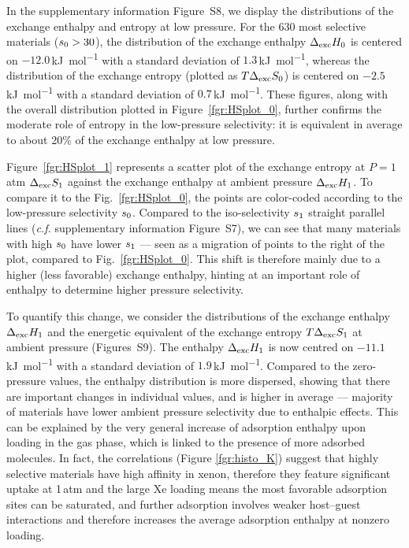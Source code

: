 \documentclass[main]{subfiles}
\begin{document}
  
  In the supplementary information Figure~S8, we display the distributions of the exchange enthalpy and entropy at low pressure. For the 630 most selective materials ($s_{\text{0}} > 30$), the distribution of the exchange enthalpy $\Delta_{\text{exc}}H_{\text{0}}$ is centered on $-12.0$\,\si{\kilo\joule\per\mol} with a standard deviation of $1.3$\,\si{\kilo\joule\per\mol}, whereas the distribution of the exchange entropy (plotted as $T\Delta_{\text{exc}}S_{\text{0}}$) is centered on $-2.5$\,\si{\kilo\joule\per\mol} with a standard deviation of $0.7$\,\si{\kilo\joule\per\mol}. These figures, along with the overall distribution plotted in Figure~\ref{fgr:HSplot_0}, further confirms the moderate role of entropy in the low-pressure selectivity: it is equivalent in average to about {20\%} of the exchange enthalpy at low pressure.
  
  Figure~\ref{fgr:HSplot_1} represents a scatter plot of the exchange entropy at $P = 1$\,atm $\Delta_{\text{exc}}S_{\text{1}}$ against the exchange enthalpy at ambient pressure $\Delta_{\text{exc}}H_{\text{1}}$. To compare it to the Fig.~\ref{fgr:HSplot_0}, the points are color-coded according to the low-pressure selectivity $s_{\text{0}}$. Compared to the iso-selectivity $s_{\text{1}}$ straight parallel lines (\emph{c.f.} supplementary information Figure~S7), we can see that many materials with high $s_{\text{0}}$ have lower $s_{\text{1}}$ --- seen as a migration of points to the right of the plot, compared to Fig.~\ref{fgr:HSplot_0}. This shift is therefore mainly due to a higher (less favorable) exchange enthalpy, hinting at an important role of enthalpy to determine higher pressure selectivity.
  
  To quantify this change, we consider the distributions of the exchange enthalpy $\Delta_{\text{exc}}H_{\text{1}}$ and the energetic equivalent of the exchange entropy $T\Delta_{\text{exc}}S_{\text{1}}$ at ambient pressure (Figures~S9). The enthalpy $\Delta_{\text{exc}}H_{\text{1}}$ is now centred on $-11.1$\,\si{\kilo\joule\per\mol} with a standard deviation of $1.9$\,\si{\kilo\joule\per\mol}. Compared to the zero-pressure values, the enthalpy distribution is more dispersed, showing that there are important changes in individual values, and is higher in average --- majority of materials have lower ambient pressure selectivity due to enthalpic effects. This can be explained by the very general increase of adsorption enthalpy upon loading in the gas phase, which is linked to the presence of more adsorbed molecules. In fact, the correlations (Figure \ref{fgr:histo_K}) suggest that highly selective materials have high affinity in xenon, therefore they feature significant uptake at 1\,atm and the large Xe loading means the most favorable adsorption sites can be saturated, and further adsorption involves weaker host--guest interactions and therefore increases the average adsorption enthalpy at nonzero loading.
  
\end{document}
